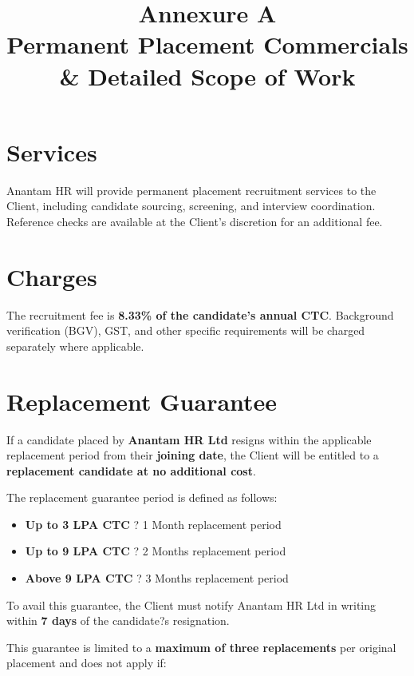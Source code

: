 \documentclass[12pt]{article}
\title{
\vspace{-1cm}
\textcolor{primary}{\Huge \textbf{Annexure A}} \\
\vspace{0.4cm}
\Large Permanent Placement Commercials \\
\Large \& Detailed Scope of Work
}
\date{}
\begin{document}
\maketitle
\thispagestyle{fancy}

\vspace{0.5cm}

\section{Services}

Anantam HR will provide permanent placement recruitment services to the Client, including candidate sourcing, screening, and interview coordination. Reference checks are available at the Client's discretion for an additional fee.

\section{Charges}

The recruitment fee is \textbf{8.33\% of the candidate's annual CTC}. Background verification (BGV), GST, and other specific requirements will be charged separately where applicable.

\section{Replacement Guarantee}

If a candidate placed by \textbf{Anantam HR Ltd} resigns within the applicable replacement period from their \textbf{joining date}, the Client will be entitled to a \textbf{replacement candidate at no additional cost}.

The replacement guarantee period is defined as follows:

\begin{itemize}[leftmargin=1.2cm]
\item \textbf{Up to 3 LPA CTC} ? 1 Month replacement period
\item \textbf{Up to 9 LPA CTC} ? 2 Months replacement period
\item \textbf{Above 9 LPA CTC} ? 3 Months replacement period
\end{itemize}

To avail this guarantee, the Client must notify Anantam HR Ltd in writing within \textbf{7 days} of the candidate?s resignation.

This guarantee is limited to a \textbf{maximum of three replacements} per original placement and does not apply if:
\end{document}
